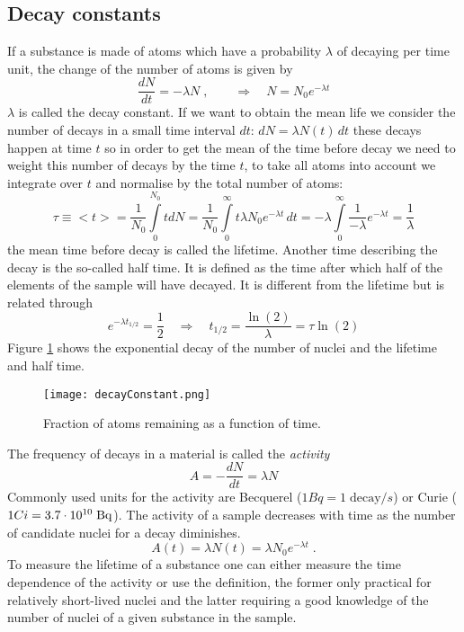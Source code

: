 \documentclass[12pt]{article}
\begin{document}
\subsection{Decay constants}
If a substance is made of atoms which have a probability $\lambda$ of decaying per time unit, the change of the number of atoms is given by
\[\frac{dN}{dt}=-\lambda N\;,\qquad\Rightarrow \quad N=N_0 e^{-\lambda t}\]
$\lambda$ is called the decay constant. If we want to obtain the mean life we consider the number of decays in a small time interval $dt$: $dN=\lambda N(t)\,dt$ these decays happen at time $t$ so in order to get the mean of the time before decay we need to weight this number of decays by the time $t$, to take all atoms into account we integrate over $t$ and normalise by the total number of atoms:
\[\tau\equiv<t>=\frac{1}{N_0}\int\limits_{0}^{N_0} t dN =\frac{1}{N_0}\int\limits_0^\infty t \lambda N_0 e^{-\lambda t}\,dt=-\lambda\int\limits_0^\infty\frac{1}{-\lambda}e^{-\lambda t}=\frac{1}{\lambda}\]
the mean time before decay is called the lifetime. Another time describing the decay is the so-called half time. It is defined as the time after which half of the elements of the sample will have decayed. It is different from the lifetime but is related through
\[e^{-\lambda t_{1/2}}=\frac12 \quad\Rightarrow \quad t_{1/2}=\frac{\ln(2)}{\lambda}=\tau \ln(2)\]
Figure \ref{fig:decayConstant} shows the exponential decay of the number of nuclei and the lifetime and half time.
\begin{figure}
\begin{center}
\texttt{[image: decayConstant.png]}
\caption{Fraction of atoms remaining as a function of time.}\label{fig:decayConstant}
\end{center}
\end{figure}
The frequency of decays in a material is called the \emph{activity}
\[A=-\frac{dN}{dt}=\lambda N\]
Commonly used units for the activity are Becquerel ($1 Bq=1\;\mbox{decay}/s$) or Curie ($1 Ci=3.7\cdot 10^{10}\;\rm Bq$). The activity of a sample decreases with time as the number of candidate nuclei for a decay diminishes.
\[A(t)=\lambda N(t)=\lambda N_0 e^{-\lambda t}\;.\]
To measure the lifetime of a substance one can either measure the time dependence of the activity or use the definition, the former only practical for relatively short-lived nuclei and the latter requiring a good knowledge of the number of nuclei of a given substance in the sample.
%
%
%
\end{document}
